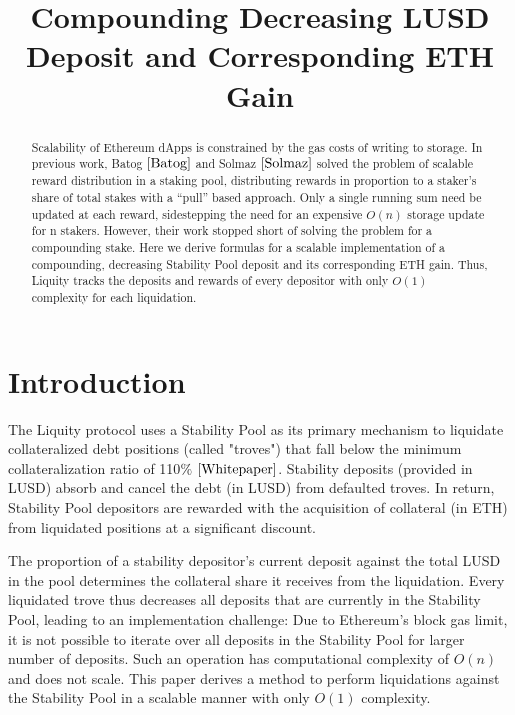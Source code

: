 \documentclass[reqno]{article}
\begin{document}
\title{\textbf{Compounding Decreasing LUSD Deposit and Corresponding ETH Gain}}
\date{} %
\maketitle
\begin{abstract}
    Scalability of Ethereum dApps is constrained by the gas costs of writing to storage. 
    In previous work, Batog $\cite{Batog}$ and Solmaz $\cite{Solmaz}$ solved the problem of scalable reward distribution in a staking pool, distributing rewards in proportion to a staker’s share of total stakes with a “pull” based approach. Only a single running sum need be updated at each reward, sidestepping the need for an expensive $O(n)$ storage update for n stakers. However, their work stopped short of solving the problem for a compounding stake.
    Here we derive formulas for a scalable implementation of a compounding, decreasing Stability Pool deposit and its corresponding ETH gain. Thus, Liquity tracks the deposits and rewards of every depositor with only $O(1)$ complexity for each liquidation.
\end{abstract}

\section{Introduction}
The Liquity protocol uses a Stability Pool as its primary mechanism to liquidate collateralized debt positions (called "troves") that fall below the minimum collateralization ratio of 110$\%$ $\cite{Whitepaper}$. Stability deposits (provided in LUSD) absorb and cancel the debt (in LUSD) from defaulted troves. In return, Stability Pool depositors are rewarded with the acquisition of collateral (in ETH) from liquidated positions at a significant discount. 

The proportion of a stability depositor’s current deposit against the total LUSD in the pool determines the collateral share it receives from the liquidation. Every liquidated trove thus decreases all deposits that are currently in the Stability Pool, leading to an implementation challenge: Due to Ethereum's block gas limit, it is not possible to iterate over all deposits in the Stability Pool for larger number of deposits. Such an operation has computational complexity of $O(n)$ and does not scale. This paper derives a method to perform liquidations against the Stability Pool in a scalable manner with only $O(1)$ complexity.
\end{document}
